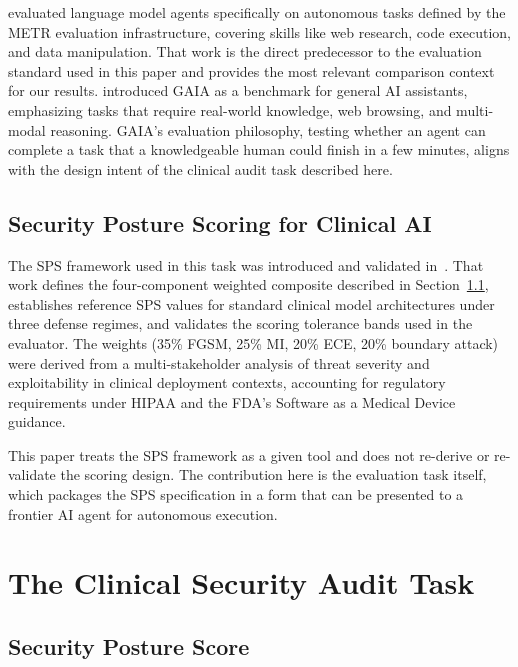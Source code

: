 \documentclass[11pt]{article}
\begin{document}
\citet{kinniment2023evaluating} evaluated language model agents specifically
on autonomous tasks defined by the METR evaluation infrastructure, covering
skills like web research, code execution, and data
manipulation. That work is the direct predecessor to the evaluation standard
used in this paper and provides the most relevant comparison context for our
results. \citet{mialon2024gaia} introduced GAIA as a benchmark for general AI
assistants, emphasizing tasks that require real-world knowledge, web browsing,
and multi-modal reasoning. GAIA's evaluation philosophy, testing whether an
agent can complete a task that a knowledgeable human could finish in a few
minutes, aligns with the design intent of the clinical audit task described
here.

\subsection{Security Posture Scoring for Clinical AI}

The SPS framework used in this task was introduced and validated
in~\citet{eniolade2026security}. That work defines the four-component weighted
composite described in Section~\ref{sec:sps}, establishes reference SPS values
for standard clinical model architectures under three defense regimes, and
validates the scoring tolerance bands used in the evaluator. The weights
(35\% FGSM, 25\% MI, 20\% ECE, 20\% boundary attack) were derived from a
multi-stakeholder analysis of threat severity and exploitability in clinical
deployment contexts, accounting for regulatory requirements under HIPAA and
the FDA's Software as a Medical Device guidance.

This paper treats the SPS framework as a given tool and does not re-derive
or re-validate the scoring design. The contribution here is the evaluation
task itself, which packages the SPS specification in a form that can be
presented to a frontier AI agent for autonomous execution.

\section{The Clinical Security Audit Task}
\label{sec:task}

\subsection{Security Posture Score}
\label{sec:sps}
\end{document}
